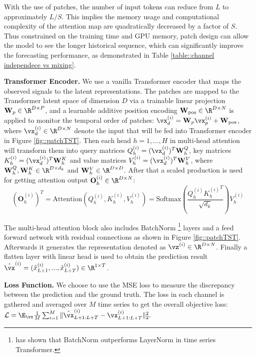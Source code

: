 \documentclass{article} %
\begin{document}
With the use of patches, the number of input tokens can reduce from $L$ to approximately $L/S$. This implies the memory usage and computational complexity of the attention map are quadratically decreased by a factor of $S$. Thus constrained on the training time and GPU memory, patch design can allow the model to see the longer historical sequence, which can significantly improve the forecasting performance, as demonstrated in Table \ref{table::channel independece vs mixing}.

\textbf{Transformer Encoder.} We use a vanilla Transformer encoder that maps the observed signals to the latent representations. The patches are mapped to the Transformer latent space of dimension $D$ via a trainable linear projection $\mathbf{W}_p\in \R^{D \times P}$, and a learnable additive position encoding $\mathbf{W}_{\text{pos}}\in \R^{D \times N}$ is applied to monitor the temporal order of patches: $\vx^{(i)}_d = \mathbf{W}_p \vx^{(i)}_p + \mathbf{W}_{\text{pos}}$, where $\vx^{(i)}_d \in \R^{D \times N}$ denote the input that will be fed into Transformer encoder in Figure \ref{fig::patchTST}. Then each head $h=1,...,H$ in multi-head attention will transform them into query matrices $Q^{(i)}_h=(\vx^{(i)}_d)^T\mathbf{W}^Q_h$, key matrices $ K^{(i)}_h=(\vx^{(i)}_d)^T\mathbf{W}^K_h$ and value matrices $V^{(i)}_h=(\vx^{(i)}_d)^T\mathbf{W}^V_h$, where $\mathbf{W}^Q_h,\mathbf{W}^K_h \in \R^{D \times d_k}$ and $\mathbf{W}^V_h \in \R^{D \times D}$. After that a scaled production is used for getting attention output $\mathbf{O}^{(i)}_h\in \R^{D \times N}$:
$$
(\mathbf{O}^{(i)}_h)^T = \text{Attention}(Q^{(i)}_h,K^{(i)}_h,V^{(i)}_h) = \text{Softmax} (\frac{{Q^{(i)}_h}{K^{(i)}_h}^T}{\sqrt{d_k}})V^{(i)}_h
$$

The multi-head attention block also includes BatchNorm \footnote{\citet{tst} has shown that BatchNorm outperforms LayerNorm in time series Transformer.} layers and a feed forward network with residual connections as shown in Figure \ref{fig::patchTST}. Afterwards it generates the representation denoted as $\vz^{(i)} \in \R^{D \times N}$. Finally a flatten layer with linear head is used to obtain the prediction result $\hat{\vx}^{(i)}= (\hat{x}^{(i)}_{L+1},..., \hat{x}^{(i)}_{L+T}) \in \R^{1 \times T}$.

\textbf{Loss Function.} We choose to use the MSE loss to measure the discrepancy between the prediction and the ground truth. The loss in each channel is gathered and averaged over $M$ time series to get the overall objective loss: 
$
\mathcal{L} = \E_{\vx} \frac{1}{M}\sum_{i=1}^M \| \hat{\vx}^{(i)}_{L+1:L+T} - \vx^{(i)}_{L+1:L+T} \|_2^2.
$
\end{document}
